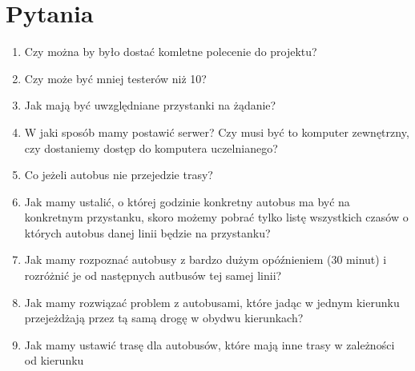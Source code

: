 \documentclass{article}
\begin{document}
\section{Pytania}
\begin{enumerate}
    \item Czy można by było dostać komletne polecenie do projektu?
    \item Czy może być mniej testerów niż 10?
    \item Jak mają być uwzględniane przystanki na żądanie?
    \item W jaki sposób mamy postawić serwer? Czy musi być to komputer zewnętrzny, czy dostaniemy dostęp do komputera uczelnianego?
    \item Co jeżeli autobus nie przejedzie trasy?
    \item Jak mamy ustalić, o której godzinie konkretny autobus ma być na konkretnym przystanku, skoro możemy pobrać tylko listę wszystkich czasów o których autobus danej linii będzie na przystanku?
    \item Jak mamy rozpoznać autobusy z bardzo dużym opóźnieniem (30 minut) i rozróżnić je od następnych autbusów tej samej linii?
    \item Jak mamy rozwiązać problem z autobusami, które jadąc w jednym kierunku przejeżdżają przez tą samą drogę w obydwu kierunkach?
    \item Jak mamy ustawić trasę dla autobusów, które mają inne trasy w zależności od kierunku
\end{enumerate}
\end{document}
